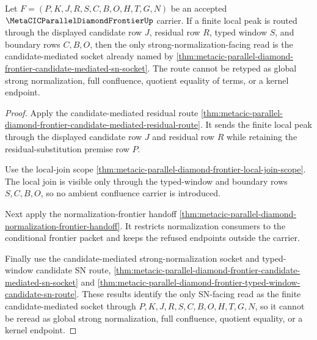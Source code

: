 \begin{theorem}
\label{thm:metacic-parallel-diamond-frontier-finite-candidate-sn-extension}
Let $F=(P,K,J,R,S,C,B,O,H,T,G,N)$ be an accepted $\MetaCICParallelDiamondFrontierUp$ carrier. If a finite local peak is routed through the displayed candidate row $J$, residual row $R$, typed window $S$, and boundary rows $C,B,O$, then the only strong-normalization-facing read is the candidate-mediated socket already named by \autoref{thm:metacic-parallel-diamond-frontier-candidate-mediated-sn-socket}. The route cannot be retyped as global strong normalization, full confluence, quotient equality of terms, or a kernel endpoint.
\end{theorem}
\begin{proof}
Apply the candidate-mediated residual route \autoref{thm:metacic-parallel-diamond-frontier-candidate-mediated-residual-route}. It sends the finite local peak through the displayed candidate row $J$ and residual row $R$ while retaining the residual-substitution premise row $P$.

Use the local-join scope \autoref{thm:metacic-parallel-diamond-frontier-local-join-scope}. The local join is visible only through the typed-window and boundary rows $S,C,B,O$, so no ambient confluence carrier is introduced.

Next apply the normalization-frontier handoff \autoref{thm:metacic-parallel-diamond-normalization-frontier-handoff}. It restricts normalization consumers to the conditional frontier packet and keeps the refused endpoints outside the carrier.

Finally use the candidate-mediated strong-normalization socket and typed-window candidate SN route, \autoref{thm:metacic-parallel-diamond-frontier-candidate-mediated-sn-socket} and \autoref{thm:metacic-parallel-diamond-frontier-typed-window-candidate-sn-route}. These results identify the only SN-facing read as the finite candidate-mediated socket through $P,K,J,R,S,C,B,O,H,T,G,N$, so it cannot be reread as global strong normalization, full confluence, quotient equality, or a kernel endpoint.
\end{proof}

